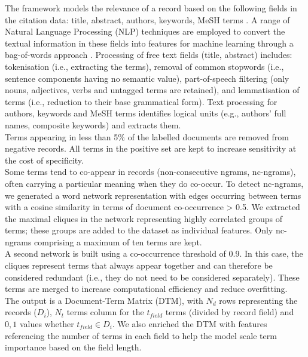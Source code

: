 \documentclass[]{bmcart}
\begin{document}
The framework models the relevance of a record based on the following
fields in the citation data: title, abstract, authors, keywords, MeSH
terms \citep{lipscomb2000medical}. A range of Natural Language
Processing (NLP) techniques
\citep{baeza1999modern, marshall2015systematic, ananiadou2006text} are
employed to convert the textual information in these fields into
features for machine learning through a bag-of-words approach
\citep{marshall2015systematic}. Processing of free text fields (title,
abstract) includes: tokenisation (i.e., extracting the terms), removal
of common stopwords (i.e., sentence components having no semantic
value), part-of-speech filtering (only nouns, adjectives, verbs and
untagged terms are retained), and lemmatisation of terms (i.e.,
reduction to their base grammatical form). Text processing for authors,
keywords and MeSH terms identifies logical units (e.g., authors' full
names, composite keywords) and extracts them.\\
Terms appearing in less than 5\% of the labelled documents are removed
from negative records. All terms in the positive set are kept to
increase sensitivity at the cost of specificity.\\
Some terms tend to co-appear in records (non-consecutive ngrams,
nc-ngrams), often carrying a particular meaning when they do co-occur.
To detect nc-ngrams, we generated a word network representation
\citep{rousseau2015graph} with edges occurring between terms with a
cosine similarity in terms of document co-occurrence \textgreater{} 0.5.
We extracted the maximal cliques in the network
\citep{eppstein2010listing} representing highly correlated groups of
terms; these groups are added to the dataset as individual features.
Only nc-ngrams comprising a maximum of ten terms are kept.\\
A second network is built using a co-occurrence threshold of 0.9. In
this case, the cliques represent terms that always appear together and
can therefore be considered redundant (i.e., they do not need to be
considered separately). These terms are merged to increase computational
efficiency and reduce overfitting.\\
The output is a Document-Term Matrix (DTM), with \(N_d\) rows
representing the records (\(D_i\)), \(N_t\) terms column for the
\(t_{field}\) terms (divided by record field) and \({0,1}\) values
whether \(t_{field} \in D_i\). We also enriched the DTM with features
referencing the number of terms in each field to help the model scale
term importance based on the field length.
\end{document}
